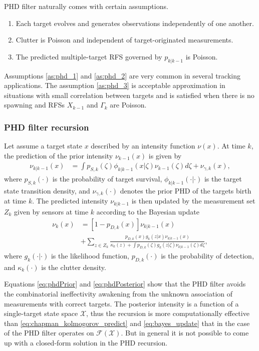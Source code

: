 PHD filter naturally comes with certain assumptions.
\begin{enumerate}
    \item Each target evolves and generates observations independently of one another. \label{as:phd_1}
    \item Clutter is Poisson and independent of target-originated measurements. \label{as:phd_2}
    \item The predicted multiple-target RFS governed by $p_{k|k-1}$ is Poisson. \label{as:phd_3}
\end{enumerate}

Assumptions \ref{as:phd_1} and \ref{as:phd_2} are very common in several tracking applications. The assumption \ref{as:phd_3} is acceptable approximation in situations with small correlation between targets and is satisfied when
there is no spawning and RFSs $X_{k-1}$ and $\Gamma_k$ are Poisson.

            \subsubsection{PHD filter recursion}
Let assume a target state $x$ described by an intensity function $\nu(x)$. At time $k$, the prediction of the prior intensity $\nu_{k-1}(x)$ is given by
\begin{align}
    \nu_{k|k-1}(x) &= \int p_{S,k}(\zeta)\phi_{k|k-1}(x|\zeta)\nu_{k-1}(\zeta)d\zeta + \nu_{\gamma,k}(x), \label{eq:phdPrior}
\end{align}
where $p_{S,k}(\cdot)$ is the probability of target survival, $\phi_{k|k-1}(\cdot|\cdot)$ is the target state transition density, and $\nu_{\gamma,k}(\cdot)$ denotes the prior PHD of the targets birth at time $k$.
The predicted intensity $\nu_{k|k-1}$ is then updated by the measurement set $Z_k$ given by sensors at time $k$ according to the Bayesian update
\begin{align}
        \nu_k(x) &= [1 - p_{D,k}(x)]\nu_{k|k-1}(x) \\
        &+ \sum_{z \in Z_k}\frac{p_{D,k}(x) g_k(z|x) \nu_{k|k-1}(x)}{\kappa_k(z) + \int p_{D,k}(\zeta) g_k(z|\zeta) \nu_{k|k-1}(\zeta)d\zeta}, \label{eq:phdPosterior}
\end{align}
where $g_k(\cdot|\cdot)$ is the likelihood function, $p_{D,k}(\cdot)$ is the probability of detection, and $\kappa_k(\cdot)$ is the clutter density.

Equations \eqref{eq:phdPrior} and \eqref{eq:phdPosterior} show that the PHD filter avoids the combinatorial
ineffectivity awakening from the unknown association of measurements with correct targets. The posterior intensity is
a function of a single-target state space $\mathcal{X}$, thus the recursion is more computationally effective than \eqref{eq:chapman_kolmogorov_predict} and \eqref{eq:bayes_update} that in the case of the PHD filter operates on $\mathcal{F(X)}$. But in general it is not possible to come up with a closed-form solution in the PHD recursion.

